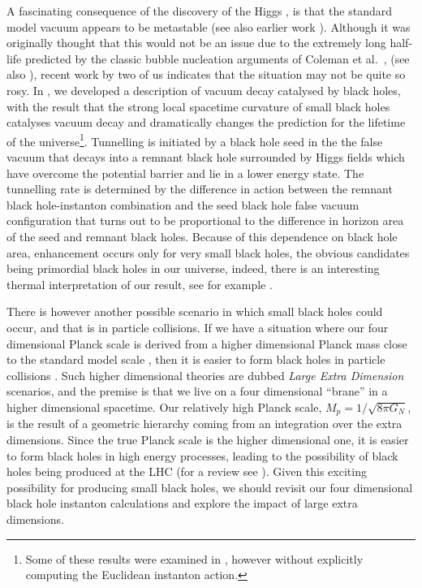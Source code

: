 \documentclass[aps,12pt,prd,superscriptaddress,preprintnumbers, 
	amssymb,
	amsmath,
	notitlepage,
	longbibliography,
	nofootinbib]{revtex4-1}
\begin{document}
A fascinating consequence of the discovery of the Higgs 
\cite{ATLAS:2012ae,Chatrchyan:2012tx}, is that the standard model 
vacuum appears to be metastable \cite{Degrassi:2012ry,
Gorsky:2014una,Bezrukov:2014ina,Ellis:2015dha,Blum:2015rpa}
(see also earlier work \cite{Krive:1976sg,1982Natur.298,
Sher:1988mj,Isidori:2001bm,EliasMiro:2011aa}). Although it was originally thought 
that this would not be an issue due to the extremely long half-life 
predicted by the classic bubble nucleation arguments of 
Coleman et al.\ \cite{coleman1977,callan1977,CDL}, (see also
\cite{Kobzarev:1974cp}), recent work by two of us
\cite{GMW,BGM1,BGM2,BGM3,Gregory:2016xix} indicates that
the situation may not be quite so rosy.
In \cite{GMW}, we developed
a description of vacuum decay catalysed by black holes,
with the result that the strong local spacetime curvature of
small black holes catalyses vacuum decay and
dramatically changes the prediction for the lifetime of the 
universe\footnote{Some of these results were examined in \cite{Tetradis:2016vqb}, 
however without explicitly computing the Euclidean instanton action.}.
Tunnelling is initiated by a black hole seed in the the false vacuum 
that decays into a remnant black hole surrounded by Higgs fields 
which have overcome the potential barrier and lie in a lower energy
state. The tunnelling rate is determined by the difference in action between
the remnant black hole-instanton combination and the seed black hole
false vacuum configuration that turns out to be proportional to the difference
in horizon area of the seed and remnant black holes. Because of
this dependence on black hole area, enhancement occurs
only for very small black holes, the obvious candidates being
primordial black holes in our universe, indeed, there is an
interesting thermal interpretation of our result, see for example
\cite{Chen:2017suz,Gorbunov:2017fhq,Mukaida:2017bgd}.

There is however another possible scenario in which small black
holes could occur, and that is in particle collisions. If we have a situation
where our four dimensional Planck scale is derived from a higher 
dimensional Planck mass close to the standard model scale
\cite{ArkaniHamed:1998rs,Antoniadis:1998ig,Randall:1999ee,
Randall:1999vf}, then
it is easier to form black holes in particle collisions 
\cite{Giddings:2001bu,Dimopoulos:2001hw,Landsberg:2003br,Harris:2004xt}. 
Such higher dimensional 
theories are dubbed \emph{Large Extra Dimension} scenarios, 
and the premise is that we live
on a four dimensional ``brane'' in a higher dimensional spacetime.
Our relatively high Planck scale, $M_p = 1/\sqrt{8\pi G_N}$, is the result of a 
geometric hierarchy coming from an integration over the extra dimensions.
Since the true Planck scale is the higher dimensional one, 
it is easier to form black holes in high energy processes,
leading to the possibility of black holes being
produced at the LHC (for a review see \cite{Park:2012fe}).
Given this exciting possibility for producing small black holes, 
we should revisit our four dimensional black hole instanton 
calculations and explore the impact of large extra dimensions.
\end{document}
